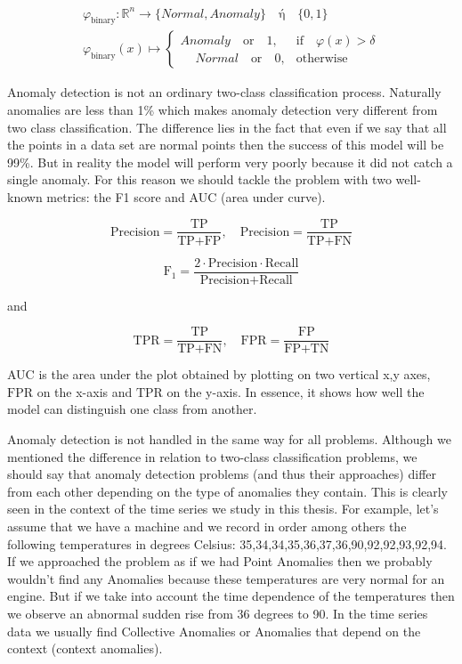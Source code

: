 \documentclass[a4paper,12pt]{report}
\theoremstyle{definitionNODot}
\begin{document}
	\begin{align*}
		\varphi_\text{binary} \colon \mathbb{R}^n \rightarrow \{Normal, Anomaly\} \quad \text{ή} \quad \{0,1\} \\
		\varphi_\text{binary}(x) \mapsto \begin{cases}
			Anomaly \quad \text{or} \quad 1, & \text{if} \quad \varphi(x) > \delta \\
			\phantom{-}Normal \quad \text{or} \quad 0, & \text{otherwise}
		\end{cases}
	\end{align*}
	
	Anomaly detection is not an ordinary two-class classification process. Naturally anomalies are less than 1\% which makes anomaly detection very different from two class classification. The difference lies in the fact that even if we say that all the points in a data set are normal points then the success of this model will be 99\%. But in reality the model will perform very poorly because it did not catch a single anomaly. For this reason we should tackle the problem with two well-known metrics: the F1 score and AUC (area under curve).
	
	$$ \text{Precision} = \frac{\text{TP}}{\text{TP}+\text{FP}}, \quad \text{Precision} = \frac{\text{TP}}{\text{TP}+\text{FN}} $$
	
	$$ \text{F}_1 = \frac{2 \cdot \text{Precision} \cdot \text{Recall}}{\text{Precision}+\text{Recall}} $$
	
	and
	
	$$ \text{TPR} = \frac{\text{TP}}{\text{TP}+\text{FN}}, \quad \text{FPR} = \frac{\text{FP}}{\text{FP}+\text{TN}} $$
	
	AUC is the area under the plot obtained by plotting on two vertical x,y axes, $ \text{FPR} $ on the x-axis and $ \text{TPR} $ on the y-axis. In essence, it shows how well the model can distinguish one class from another.
	
	Anomaly detection is not handled in the same way for all problems. Although we mentioned the difference in relation to two-class classification problems, we should say that anomaly detection problems (and thus their approaches) differ from each other depending on the type of anomalies they contain. This is clearly seen in the context of the time series we study in this thesis. For example, let's assume that we have a machine and we record in order among others the following temperatures in degrees Celsius: 35,34,34,35,36,37,36,90,92,92,93,92,94. If we approached the problem as if we had Point Anomalies then we probably wouldn't find any Anomalies because these temperatures are very normal for an engine. But if we take into account the time dependence of the temperatures then we observe an abnormal sudden rise from 36 degrees to 90. In the time series data we usually find Collective Anomalies or Anomalies that depend on the context (context anomalies).
	
\end{document}
